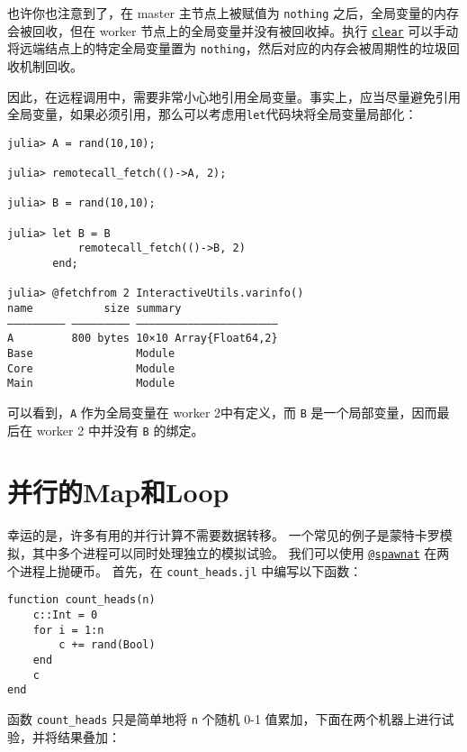 也许你也注意到了，在 master 主节点上被赋值为 \texttt{nothing} 之后，全局变量的内存会被回收，但在 worker 节点上的全局变量并没有被回收掉。执行 \href{@ref}{\texttt{clear}} 可以手动将远端结点上的特定全局变量置为 \texttt{nothing}，然后对应的内存会被周期性的垃圾回收机制回收。



因此，在远程调用中，需要非常小心地引用全局变量。事实上，应当尽量避免引用全局变量，如果必须引用，那么可以考虑用\texttt{let}代码块将全局变量局部化：




\begin{verbatim}
julia> A = rand(10,10);

julia> remotecall_fetch(()->A, 2);

julia> B = rand(10,10);

julia> let B = B
           remotecall_fetch(()->B, 2)
       end;

julia> @fetchfrom 2 InteractiveUtils.varinfo()
name           size summary
––––––––– ––––––––– ––––––––––––––––––––––
A         800 bytes 10×10 Array{Float64,2}
Base                Module
Core                Module
Main                Module
\end{verbatim}



可以看到，\texttt{A} 作为全局变量在 worker 2中有定义，而 \texttt{B} 是一个局部变量，因而最后在 worker 2 中并没有 \texttt{B} 的绑定。



\hypertarget{3256700896084516736}{}


\section{并行的Map和Loop}



幸运的是，许多有用的并行计算不需要数据转移。 一个常见的例子是蒙特卡罗模拟，其中多个进程可以同时处理独立的模拟试验。 我们可以使用 \hyperlink{11231712027010946923}{\texttt{@spawnat}} 在两个进程上抛硬币。 首先，在 \texttt{count\_heads.jl} 中编写以下函数：




\begin{verbatim}
function count_heads(n)
    c::Int = 0
    for i = 1:n
        c += rand(Bool)
    end
    c
end
\end{verbatim}



函数 \texttt{count\_heads} 只是简单地将 \texttt{n} 个随机 0-1 值累加，下面在两个机器上进行试验，并将结果叠加：




